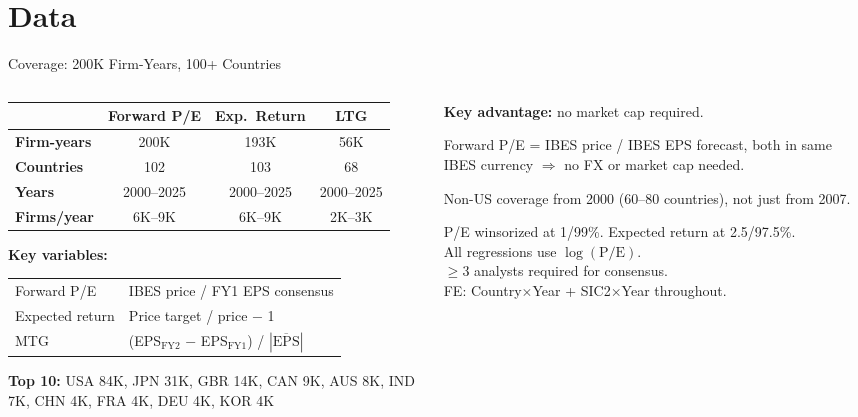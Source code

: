 \documentclass[aspectratio=169, 11pt]{beamer}
\begin{document}
\section{Data}

\begin{frame}{Coverage: 200K Firm-Years, 100+ Countries}
\vspace{-0.1cm}
\footnotesize
\begin{columns}[T]
\begin{column}{0.56\textwidth}
\renewcommand{\arraystretch}{0.92}
\begin{tabular}{@{}lccc@{}}
\toprule
& \textbf{Forward P/E} & \textbf{Exp.\ Return} & \textbf{LTG} \\
\midrule
\textbf{Firm-years} & 200K & 193K & 56K \\
\textbf{Countries} & 102 & 103 & 68 \\
\textbf{Years} & 2000--2025 & 2000--2025 & 2000--2025 \\
\textbf{Firms/year} & 6K--9K & 6K--9K & 2K--3K \\
\bottomrule
\end{tabular}
\renewcommand{\arraystretch}{1.0}

\vspace{0.15cm}
\textbf{Key variables:}
\begin{tabular}{@{}lp{4.8cm}@{}}
Forward P/E & IBES price / FY1 EPS consensus \\
Expected return & Price target / price $-$ 1 \\
MTG & (EPS$_{\text{FY2}}$ $-$ EPS$_{\text{FY1}}$) / $|\overline{\text{EPS}}|$ \\
\end{tabular}

\vspace{0.1cm}
\textbf{Top 10:} USA 84K, JPN 31K, GBR 14K, CAN 9K, AUS 8K, IND 7K, CHN 4K, FRA 4K, DEU 4K, KOR 4K
\end{column}
\begin{column}{0.41\textwidth}
\vspace{0.1cm}
\small
\textbf{Key advantage:} no market cap required.

\vspace{0.1cm}
\footnotesize
Forward P/E = IBES price / IBES EPS forecast, both in same IBES currency $\Rightarrow$ no FX or market cap needed.

\vspace{0.15cm}
Non-US coverage from 2000 (60--80 countries), not just from 2007.

\vspace{0.15cm}
\scriptsize
P/E winsorized at 1/99\%. Expected return at 2.5/97.5\%.\\
All regressions use $\log(\text{P/E})$.\\
$\geq$3 analysts required for consensus.\\
FE: Country$\times$Year + SIC2$\times$Year throughout.
\end{column}
\end{columns}
\end{frame}
\end{document}
